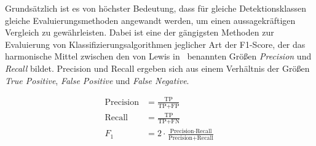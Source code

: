 Grundsätzlich ist es von höchster Bedeutung, dass für gleiche Detektionsklassen gleiche Evaluierungsmethoden angewandt werden, um einen
aussagekräftigen Vergleich zu gewährleisten. Dabei ist eine der gängigsten Methoden zur Evaluierung von Klassifizierungsalgorithmen
jeglicher Art der F1-Score, der das harmonische Mittel zwischen den von Lewis in~\cite{Lewis1991} benannten Größen \textit{Precision}
und \textit{Recall} bildet. Precision und Recall ergeben sich aus einem Verhältnis der Größen \textit{True Positive}, \textit{False
Positive} und \textit{False Negative}.

\begin{align}
    \text{Precision} &= \frac{\text{TP}}{\text{TP} + \text{FP}} \label{eq:precision} \\
    \text{Recall} &= \frac{\text{TP}}{\text{TP} + \text{FN}} \label{eq:recall} \\
    F_1 &= 2 \cdot \frac{\text{Precision} \cdot \text{Recall}}{\text{Precision} + \text{Recall}} \label{eq:f1score}
\end{align}